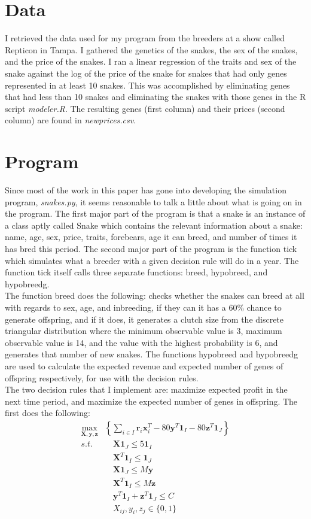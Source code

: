 \documentclass{article}
\begin{document}
	\section*{Data}
	\indent I retrieved the data used for my program from the breeders at a show called Repticon in Tampa. I gathered the genetics of the snakes, the sex of the snakes, and the price of the snakes. I ran a linear regression of the traits and sex of the snake against the log of the price of the snake for snakes that had only genes represented in at least 10 snakes. This was accomplished by eliminating genes that had less than 10 snakes and eliminating the snakes with those genes in the R script \textit{modeler.R}. The resulting genes (first column) and their prices (second column) are found in \textit{newprices.csv}.
	\section*{Program}
	\indent Since most of the work in this paper has gone into developing the simulation program, \textit{snakes.py}, it seems reasonable to talk a little about what is going on in the program. The first major part of the program is that a snake is an instance of a class aptly called Snake which contains the relevant information about a snake: name, age, sex, price, traits, forebears, age it can breed, and number of times it has bred this period. The second major part of the program is the function tick which simulates what a breeder with a given decision rule will do in a year. The function tick itself calls three separate functions: breed, hypobreed, and hypobreedg.\\\indent The function breed does the following: checks whether the snakes can breed at all with regards to sex, age, and inbreeding, if they can it has a 60\% chance to generate offspring, and if it does, it generates a clutch size from the discrete triangular distribution where the minimum observable value is 3, maximum observable value is 14, and the value with the highest probability is 6, and generates that number of new snakes. The functions hypobreed and hypobreedg are used to calculate the expected revenue and expected number of genes of offspring respectively, for use with the decision rules.\\
	\indent The two decision rules that I implement are: maximize expected profit in the next time period, and maximize the expected number of genes in offspring. The first does the following:
	\begin{align*}
		\max_{\mathbf{X},\mathbf{y},\mathbf{z}}&\left\{ \sum_{i\in I}\mathbf r_i \mathbf x_i^T - 80\mathbf y^T\mathbf 1_I - 80\mathbf z^T\mathbf 1_J \right\}\\
      s.t. & \quad\mathbf X\mathbf 1_J \leq 5\mathbf 1_I \\
      &\quad \mathbf X^T \mathbf 1_I \leq \mathbf1_J\\
      &\quad \mathbf X \mathbf1_J\leq M\mathbf y\\
      & \quad\mathbf X^T\mathbf 1_I \leq M\mathbf z\\
      &\quad \mathbf y^T\mathbf 1_I + \mathbf z^T\mathbf 1_J \leq C\\
      & \quad X_{ij}, y_i, z_j \in \{0,1\}
	\end{align*}
\end{document}
